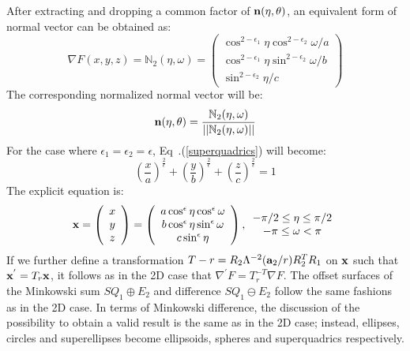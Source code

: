 \documentclass[]{article}
\newcommand{\nn}{{\bf n}}
\newcommand{\epa}{{\epsilon_1}}
\newcommand{\epb}{{\epsilon_2}}
\begin{document}
After extracting and dropping a common factor of $\nn(\eta, \theta)$, an equivalent form of normal vector can be obtained as:
\begin{equation}
\nabla F(x, y, z) =  \mathbb{N}_2(\eta, \omega) =
\left(
\begin{array}{c}
\cos^{2 - \epa}\eta \cos^{2-\epb}\omega /a \\
\cos^{2 - \epa}\eta \sin^{2-\epb}\omega /b \\
\sin^{2-\epb}\eta /c
\end{array}
\right)
\end{equation}
The corresponding normalized normal vector will be:
\begin{equation}
\nn(\eta, \theta) = \dfrac{\mathbb{N}_2 (\eta, \omega)}{||\mathbb{N}_2 (\eta, \omega)||}
\end{equation}
For the case where $\epsilon_1 = \epsilon_2 = \epsilon$,  Eq~.(\ref{superquadrics}) will become:
\begin{equation}
\left( \dfrac{x}{a} \right)^{\frac{2}{\epsilon}} +
\left( \dfrac{y}{b}\right)^{\frac{2}{\epsilon}}
+
\left( \dfrac{z}{c}\right)^{\frac{2}{\epsilon}} = 1
\label{superellipsoid}
\end{equation}
The explicit equation is:
\begin{equation}
{\bf x} =
\left(
\begin{array}{c}
x \\
y \\
z
\end{array}
\right)
=
\left(
\begin{array}{c}
a\cos^{\epsilon} \eta \cos^{\epsilon} \omega \\
b\cos^{\epsilon} \eta \sin^{\epsilon} \omega \\
c\sin^{\epsilon} \eta
\end{array}
\right)
,
\begin{array}{c}
-\pi/2 \leq \eta \leq \pi/2 \\
- \pi \leq \omega < \pi
\end{array}
\end{equation}
If we further define a transformation $T-r = R_2 \Lambda^{-2}({\bf a}_2/r)R_2^{T}R_1$ on $\bf x$ such that ${\bf x}^{'} = T_r {\bf x}$, it follows as in the 2D case that $\nabla^{\prime}F = T_r^{-T} \nabla F$. The offset surfaces of the Minkowski sum $SQ_1 \oplus E_2$ and difference $SQ_1 \ominus E_2$ follow the same fashions as in the 2D case. In terms of Minkowski difference, the discussion of the possibility to obtain a valid result is the same as in the 2D case; instead, ellipses, circles and superellipses become ellipsoids, spheres and superquadrics respectively.
\end{document}
